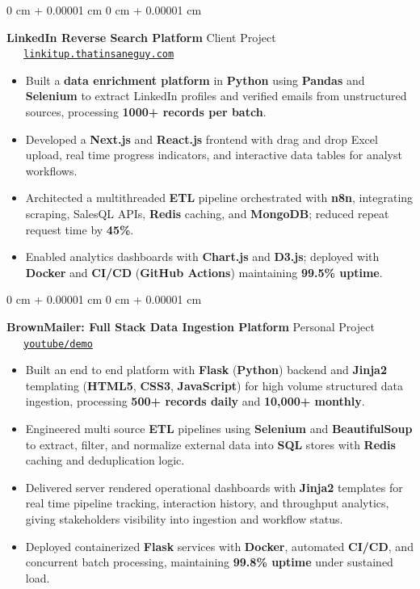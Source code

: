 \documentclass[10pt, letterpaper]{article}
\newenvironment{highlights}{
    \begin{itemize}[
        topsep=0.10 cm,
        parsep=0.10 cm,
        partopsep=0pt,
        itemsep=0pt,
        leftmargin=0 cm + 10pt
    ]
}{
    \end{itemize}
} %
\newenvironment{onecolentry}{
    \begin{adjustwidth}{
        0 cm + 0.00001 cm
    }{
        0 cm + 0.00001 cm
    }
}{
    \end{adjustwidth}
} %
\begin{document}
\begin{onecolentry}
	\textbf{LinkedIn Reverse Search Platform} \hfill Client Project \ \ \ \href{https://linkitup.thatinsaneguy.com/}{\texttt{linkitup.thatinsaneguy.com}}
	\begin{highlights}
		\item Built a \textbf{data enrichment platform} in \textbf{Python} using \textbf{Pandas} and \textbf{Selenium} to extract LinkedIn profiles and verified emails from unstructured sources, processing \textbf{1000+ records per batch}.
		\item Developed a \textbf{Next.js} and \textbf{React.js} frontend with drag and drop Excel upload, real time progress indicators, and interactive data tables for analyst workflows.
		\item Architected a multithreaded \textbf{ETL} pipeline orchestrated with \textbf{n8n}, integrating scraping, SalesQL APIs, \textbf{Redis} caching, and \textbf{MongoDB}; reduced repeat request time by \textbf{45\%}.
		\item Enabled analytics dashboards with \textbf{Chart.js} and \textbf{D3.js}; deployed with \textbf{Docker} and \textbf{CI/CD} (\textbf{GitHub Actions}) maintaining \textbf{99.5\% uptime}.
	\end{highlights}
\end{onecolentry}

\vspace{0.15 cm}

\begin{onecolentry}
	\textbf{BrownMailer: Full Stack Data Ingestion Platform} \hfill Personal Project \ \ \ \href{https://youtu.be/mUitmexEZ70?si=f4VTMKZfLqhAMujB}{\texttt{youtube/demo}}
	\begin{highlights}
		\item Built an end to end platform with \textbf{Flask} (\textbf{Python}) backend and \textbf{Jinja2} templating (\textbf{HTML5}, \textbf{CSS3}, \textbf{JavaScript}) for high volume structured data ingestion, processing \textbf{500+ records daily} and \textbf{10,000+ monthly}.
		\item Engineered multi source \textbf{ETL} pipelines using \textbf{Selenium} and \textbf{BeautifulSoup} to extract, filter, and normalize external data into \textbf{SQL} stores with \textbf{Redis} caching and deduplication logic.
		\item Delivered server rendered operational dashboards with \textbf{Jinja2} templates for real time pipeline tracking, interaction history, and throughput analytics, giving stakeholders visibility into ingestion and workflow status.
		\item Deployed containerized \textbf{Flask} services with \textbf{Docker}, automated \textbf{CI/CD}, and concurrent batch processing, maintaining \textbf{99.8\% uptime} under sustained load.
	\end{highlights}
\end{onecolentry}
\end{document}
